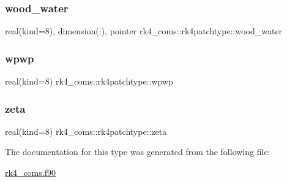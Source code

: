 \subsubsection{\texorpdfstring{wood\+\_\+water}{wood\_water}}
{\footnotesize\ttfamily real(kind=8), dimension(\+:), pointer rk4\+\_\+coms\+::rk4patchtype\+::wood\+\_\+water}

\mbox{\label{structrk4__coms_1_1rk4patchtype_a91728bf053cbc9d1a5e1b0d4e6624b64}} 
\subsubsection{\texorpdfstring{wpwp}{wpwp}}
{\footnotesize\ttfamily real(kind=8) rk4\+\_\+coms\+::rk4patchtype\+::wpwp}

\mbox{\label{structrk4__coms_1_1rk4patchtype_a35665ce92058b1d6f19447a08fd3b29f}} 
\subsubsection{\texorpdfstring{zeta}{zeta}}
{\footnotesize\ttfamily real(kind=8) rk4\+\_\+coms\+::rk4patchtype\+::zeta}



The documentation for this type was generated from the following file\+:\begin{DoxyCompactItemize}
\item 
\hyperlink{rk4__coms_8f90}{rk4\+\_\+coms.\+f90}\end{DoxyCompactItemize}
